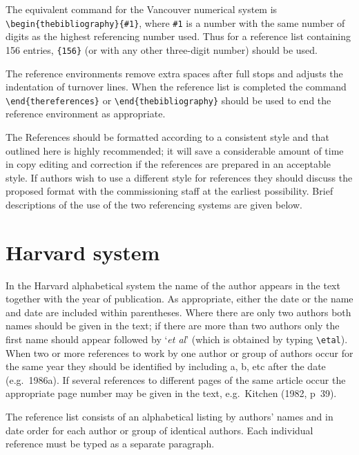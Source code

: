 The equivalent command for the Vancouver numerical 
system is
\verb"\begin{thebibliography}{#1}", where \verb"#1" is a number 
with the same number of digits as the highest referencing number used. 
Thus for a reference list containing 156 entries, \verb"{156}" (or 
with any other three-digit number) should be used.

The reference environments remove extra 
spaces after full stops and adjusts the indentation of turnover lines. 
When the reference list is completed the command \verb"\end{thereferences}" 
or \verb"\end{thebibliography}" should be 
used to end the reference environment as appropriate.

The References should be formatted according to a consistent 
style and that outlined here is highly recommended; 
it will save a considerable amount of time in copy editing and correction
if the references are prepared in an acceptable style. 
If authors wish to use a different
style for references they should discuss the proposed format with the 
commissioning staff at the earliest possibility.
Brief descriptions of the use of the two 
referencing systems are given below.

\section{Harvard system}
In the Harvard alphabetical 
system 
the name of the author appears in the text together 
with the year of publication. 
As appropriate, either the date or the name 
and date are included within parentheses. Where there are only two authors 
both names should be given in the text; if there are more than two 
authors only the first name should appear followed by `{\it et al}' 
(which is obtained by 
typing \verb"\etal"). When two or 
more references to work by one author or group of authors occur for the 
same year they should be identified by including a, b, etc after the date 
(e.g.\ 1986a). If several references to different pages of the same article 
occur the appropriate page number may be given in the text, e.g.\ Kitchen 
(1982, p~39).


The reference list consists of an 
alphabetical listing by authors' names and in date order for each 
author or group of identical authors. Each individual reference must 
be 
typed as a separate paragraph.

